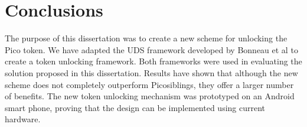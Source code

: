 \section{Conclusions}
The purpose of this dissertation was to create a new scheme for unlocking the Pico token. We have adapted the UDS framework developed by Bonneau et al \cite{bonneau2012quest} to create a token unlocking framework. Both frameworks were used in evaluating the solution proposed in this dissertation. Results have shown that although the new scheme does not completely outperform Picosiblings, they offer a larger number of benefits. The new token unlocking mechanism was prototyped on an Android smart phone, proving that the design can be implemented using current hardware.


